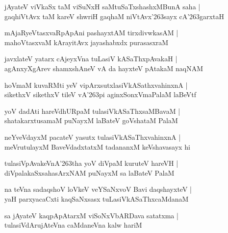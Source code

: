 \documentclass[twoside,12pt,openright]{book}
\def\S{\char'263}
\newcounter{shloka}[chapter]
\begin{document}
\begin{shloka}%
jAyateV viVkaSx taM viSuNxH saMtuSaTxshashxMBunA saha |\\
gaqhiVtAvx taM kareV shwriH gaqhaM niVtAvx\S sayx cA\S garxtaH
\end{shloka}

\begin{shloka}%
mAjaRyeVtasxvaRpApAni pashayxtAM tirxdivwkasAM |\\
mahoVtasxvaM kArayitAvx jayashabxdx purasasxraM 
\end{shloka}

\begin{shloka}%
javxlateV yatarx cAjeyxVna tuLasiV kASaThxpAvakaH |\\
agAnxyXgArev shamxshAneV vA da hayxteV pAtakaM naqNAM 
\end{shloka}

\begin{shloka}%
hoVmaM kuvaRMti yeV vipArxsutxlasiVkASathxvahinxnA |\\
sikethxV sikethxV tileV vA\S pi aginxSonxVmaPalaM laBeVtf
\end{shloka}

\begin{shloka}%
yoV dadAti hareVdhURpaM tulasiVkASaThxsaMBavaM |\\
shatakarxtusamaM puNayxM laBateV goVshataM PalaM 
\end{shloka}

\begin{shloka}%
neYveVdayxM pacateV yasutx tulasiVkASaThxvahinxnA |\\
meVrutulayxM BaveVdadxtatxM tadananxM keVshavasayx hi
\end{shloka}

\begin{shloka}%
tulasiVpAvakeVnA\S tha yoV diVpaM kuruteV hareVH |\\
diVpalakaSxsahasArxNAM puNayxM sa laBateV PalaM 
\end{shloka}

\begin{shloka}%
na teVna sadaqshoV loVkeV veYSaNxvoV Bavi daqshayxteV |\\
yaH parxyacaCxti kaqSaNxsasx tuLasiVkASaThxcaMdanaM 
\end{shloka}

\begin{shloka}%
sa jAyateV kaqpApAtarxM viSoNxVbARDava satatxma |\\
tulasiVdArujAteVna caMdaneVna kalw hariM 
\end{shloka}
\end{document}
